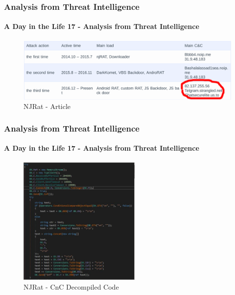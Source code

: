 \documentclass[aspectratio=169]{beamer}
\begin{document}
\begin{frame}
  \frametitle{Analysis from Threat Intelligence}
  \framesubtitle{A Day in the Life 17 - Analysis from Threat Intelligence}
  \begin{center}
    \begin{figure}
      \includegraphics[width=14cm,keepaspectratio]{njrat_article}
      \caption{NJRat - Article}
    \end{figure}
  \end{center}
\end{frame}

\begin{frame}
  \frametitle{Analysis from Threat Intelligence}
  \framesubtitle{A Day in the Life 17 - Analysis from Threat Intelligence}
  \begin{center}
    \begin{figure}
      \includegraphics[width=6cm,keepaspectratio]{njrat_cnc}
      \caption{NJRat - CnC Decompiled Code}
    \end{figure}
  \end{center}
\end{frame}
\end{document}
